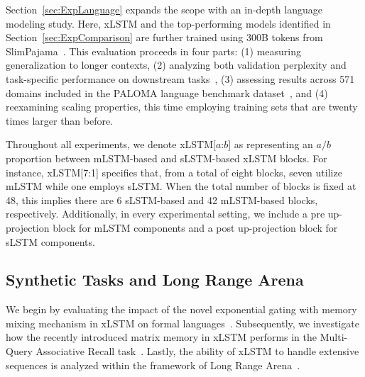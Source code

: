 Section~\ref{sec:ExpLanguage} expands the scope with an in-depth language modeling study. Here, xLSTM and the top-performing models identified in Section~\ref{sec:ExpComparison} are further trained using 300B tokens from SlimPajama~\citep{Soboleva:23}. This evaluation proceeds in four parts: (1) measuring generalization to longer contexts, (2) analyzing both validation perplexity and task-specific performance on downstream tasks~\citep{Sutawika:24}, (3) assessing results across 571 domains included in the PALOMA language benchmark dataset~\citep{Magnusson:23arxivshort}, and (4) reexamining scaling properties, this time employing training sets that are twenty times larger than before.

\label{sec:xlstm_blocks_notation}
Throughout all experiments, we denote xLSTM[$a$:$b$] as representing an $a/b$ proportion between mLSTM-based and sLSTM-based xLSTM blocks. For instance, xLSTM[7:1] specifies that, from a total of eight blocks, seven utilize mLSTM while one employs sLSTM. When the total number of blocks is fixed at 48, this implies there are 6 sLSTM-based and 42 mLSTM-based blocks, respectively. Additionally, in every experimental setting, we include a pre up-projection block for mLSTM components and a post up-projection block for sLSTM components.

\subsection{Synthetic Tasks and Long Range Arena}
\label{sec:ExpSyntethic}
We begin by evaluating the impact of the novel exponential gating with memory mixing mechanism in xLSTM on formal languages~\citep{Deletang:23}. Subsequently, we investigate how the recently introduced matrix memory in xLSTM performs in the Multi-Query Associative Recall task~\citep{Arora:23arxiv}. Lastly, the ability of xLSTM to handle extensive sequences is analyzed within the framework of Long Range Arena~\citep{Tay:21}.

